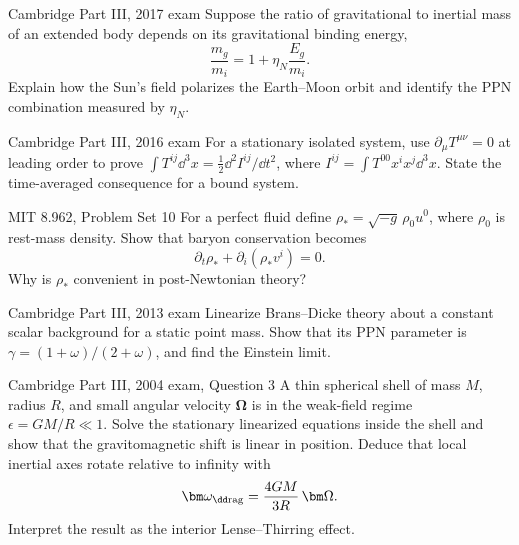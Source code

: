 \begin{exercises}
\begin{exercise}{Cambridge Part III, 2017 exam}
Suppose the ratio of gravitational to inertial mass of an extended body
depends on its gravitational binding energy,
\[
\frac{m_g}{m_i}=1+\eta_N\frac{E_g}{m_i}.
\]
Explain how the Sun's field polarizes the Earth--Moon orbit and identify the
PPN combination measured by \(\eta_N\).
\end{exercise}

\begin{exercise}{Cambridge Part III, 2016 exam}
For a stationary isolated system, use
\(\partial_\mu T^{\mu\nu}=0\) at leading order to prove
\(\int T^{ij}\dd^3x=\tfrac12\dd^2 I^{ij}/\dd t^2\), where
\(I^{ij}=\int T^{00}x^ix^j\dd^3x\).  State the time-averaged consequence for
a bound system.
\end{exercise}

\begin{exercise}{MIT 8.962, Problem Set 10}
For a perfect fluid define
\(\rho_\ast=\sqrt{-g}\,\rho_0u^0\), where \(\rho_0\) is rest-mass density.
Show that baryon conservation becomes
\[
\partial_t\rho_\ast+\partial_i(\rho_\ast v^i)=0.
\]
Why is \(\rho_\ast\) convenient in post-Newtonian theory?
\end{exercise}

\begin{exercise}{Cambridge Part III, 2013 exam}
Linearize Brans--Dicke theory about a constant scalar background for a static
point mass.  Show that its PPN parameter is
\(\gamma=(1+\omega)/(2+\omega)\), and find the Einstein limit.
\end{exercise}

\begin{exercise}{Cambridge Part III, 2004 exam, Question 3}
A thin spherical shell of mass \(M\), radius \(R\), and small angular
velocity \(\bm\Omega\) is in the weak-field regime
\(\epsilon=GM/R\ll1\).  Solve the stationary linearized equations inside the
shell and show that the gravitomagnetic shift is linear in position.  Deduce
that local inertial axes rotate relative to infinity with
\[
\bm\omega_{\rm \dd rag}=\frac{4GM}{3R}\,\bm\Omega.
\]
Interpret the result as the interior Lense--Thirring effect.
\end{exercise}



\end{exercises}

